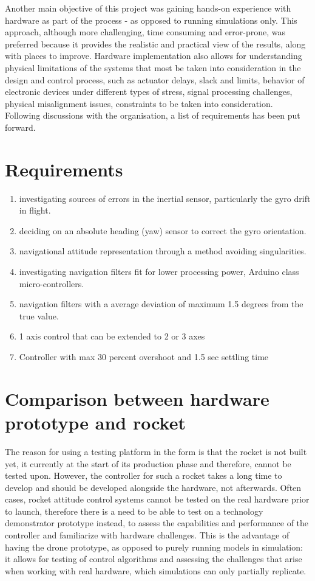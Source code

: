 Another main objective of this project was gaining hands-on experience with hardware as part of the process - as opposed to running simulations only. This approach, although more challenging, time consuming and error-prone,  was preferred because it provides the realistic and practical view of the results, along with places to improve. Hardware implementation also allows for understanding physical limitations of the systems that most be taken into consideration in the design and control process, such as actuator delays, slack and limits, behavior of electronic devices under different types of stress, signal processing challenges, physical misalignment issues, constraints to be taken into consideration. 
Following discussions with the organisation, a list of requirements has been put forward. 


\section{Requirements}

\begin{enumerate}
\item investigating sources of errors in the inertial sensor, particularly the gyro drift in flight.
\item deciding on an absolute heading (yaw) sensor to correct the gyro orientation. 
\item navigational attitude representation through a method avoiding singularities. 
\item investigating navigation filters fit for lower processing power, Arduino class micro-controllers.
\item navigation filters with a average deviation of maximum 1.5 degrees from the true value.
\item 1 axis control that can be extended to 2 or 3 axes
\item Controller with max 30 percent overshoot and 1.5 sec settling time
\end{enumerate}


\section{Comparison between hardware prototype and rocket}

The reason for using a testing platform in the form is that the rocket is not built yet, it currently at the start of its production phase and therefore, cannot be tested upon. However, the controller for such a rocket takes a long time to develop and should be developed alongside the hardware, not afterwards. Often cases, rocket attitude control systems cannot be tested on the real hardware prior to launch, therefore there is a need to be able to test on a technology demonstrator prototype instead, to assess the capabilities and performance of the controller and familiarize with hardware challenges. This is the advantage of having the drone prototype, as opposed to purely running models in simulation: it allows for testing of control algorithms and assessing the challenges that arise when working with real hardware, which simulations can only partially replicate. 

